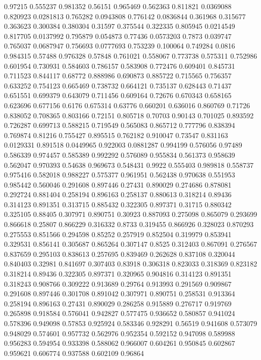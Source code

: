 0.97215 0.555237
0.981352 0.56151
0.965469 0.562363
0.811821 0.0369088
0.820923 0.0281813
0.765282 0.0943808
0.776142 0.0836844
0.361968 0.315677
0.363623 0.300384
0.380304 0.31597
0.375544 0.322335
0.805945 0.0214549
0.817705 0.0137992
0.795879 0.054873
0.77436 0.0573203
0.7873 0.039747
0.765037 0.0687947
0.756693 0.0777693
0.753239 0.100064
0.749284 0.0816
0.984315 0.57488
0.976328 0.57848
0.761021 0.558067
0.773738 0.575311
0.752986 0.601954
0.730931 0.584603
0.786157 0.583908
0.772476 0.609401
0.845731 0.711523
0.844117 0.68772
0.888986 0.690873
0.885722 0.715565
0.756357 0.633252
0.754123 0.665469
0.738732 0.664121
0.735137 0.628443
0.71437 0.651551
0.699379 0.643079
0.711456 0.609164
0.72676 0.670343
0.658165 0.623696
0.677156 0.6176
0.675314 0.63776
0.660201 0.636016
0.860769 0.71726
0.838052 0.708365
0.803166 0.72151
0.805718 0.70703
0.90143 0.701025
0.893592 0.726287
0.699713 0.588215
0.719549 0.565083
0.865712 0.777796
0.838394 0.769874
0.81216 0.755427
0.895515 0.762182
0.910047 0.73547
0.831163 0.0129331
0.891518 0.0449965
0.922003 0.0881287
0.994199 0.576056
0.97489 0.586339
0.974457 0.585389
0.992292 0.576089
0.955834 0.561373
0.958639 0.562047
0.970393 0.54638
0.969673 0.548431
0.9922 0.555403
0.989818 0.558737
0.975416 0.582018
0.988227 0.575377
0.961951 0.562438
0.970638 0.551953
0.985442 0.560046
0.291608 0.897446
0.27431 0.890029
0.274686 0.878081
0.292724 0.881404
0.258194 0.896163
0.258137 0.880613
0.318214 0.89436
0.314123 0.891351
0.313715 0.885432
0.322305 0.897371
0.31715 0.880342
0.325105 0.88405
0.307971 0.890751
0.30923 0.887093
0.275098 0.865079
0.293699 0.866618
0.25807 0.866229
0.316332 0.8733
0.319455 0.866926
0.328023 0.870293
0.275553 0.851566
0.294598 0.85252
0.257919 0.852504
0.319979 0.853941
0.329531 0.856141
0.305687 0.865264
0.307147 0.8525
0.312403 0.867091
0.276567 0.837659
0.295103 0.838613
0.257695 0.839469
0.262628 0.837108
0.320044 0.840403
0.32981 0.841697
0.307403 0.83918
0.306318 0.823033
0.318369 0.823182
0.318214 0.89436
0.322305 0.897371
0.320965 0.904816
0.314123 0.891351
0.318243 0.908766
0.309222 0.913689
0.29764 0.913993
0.291569 0.909867
0.291608 0.897446
0.301708 0.891042
0.307971 0.890751
0.258531 0.913364
0.258194 0.896163
0.27431 0.890029
0.286258 0.915889
0.276717 0.919769
0.265898 0.918584
0.576041 0.942827
0.577475 0.936652
0.580857 0.941024
0.578396 0.949098
0.57853 0.925924
0.583346 0.928291
0.56519 0.941608
0.573079 0.948029
0.574601 0.957732
0.562976 0.952354
0.592152 0.947098
0.589988 0.956283
0.594954 0.933398
0.588062 0.966007
0.604261 0.950845
0.602867 0.959621
0.606774 0.937588
0.602109 0.96864
